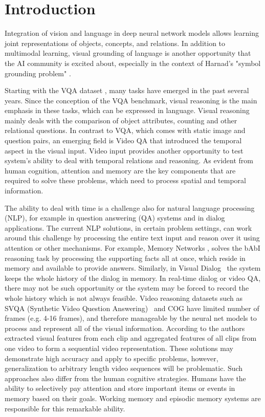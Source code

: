 \section{Introduction}

Integration of vision and language in deep neural network models allows learning joint representations of objects, concepts, and relations.  In addition to multimodal learning, visual grounding of language is another opportunity that the AI community is excited about, especially in the context of Harnad's "symbol grounding problem" \cite{harnad2003symbol}. 

Starting with the VQA dataset \cite{}, many tasks have emerged in the past several years\cite{mogadala2019trends}.  Since the conception of the VQA benchmark, visual reasoning is the main emphasis in these tasks, which can be expressed in language. Visual reasoning mainly deals with the comparison of object attributes, counting and other relational questions.
In contrast to VQA, which comes with static image and question pairs, an emerging field is Video QA \cite{} that introduced the temporal aspect in the visual input.  Video input provides another opportunity to test system's ability to deal with temporal relations and reasoning.  As evident from human cognition, attention and memory are the key components that are required to solve these problems, which need to process spatial and temporal information.

The ability to deal with time is a challenge also for natural language processing (NLP), for example in question answering (QA) systems and in dialog applications.  The current NLP solutions, in certain problem settings, can work around this challenge by processing the entire text input and reason over it using attention \cite{vaswani2017attention} or other mechanisms. For example, Memory Networks \cite{weston2015towards}, solves the bAbI reasoning task by processing the supporting facts all at once, which reside in memory and available to provide answers. Similarly, in Visual Dialog~\cite{das2017visual} the system keeps the whole history of the dialog in memory.  In real-time dialog or video QA, there may not be such opportunity or the system may be forced to record the whole history which is not always feasible.  Video reasoning datasets such as SVQA (Synthetic Video Question Answering)~\cite{song2018explore} and COG \cite{yang2018dataset} have limited number of frames (e.g. 4-16 frames), and therefore manageable by the neural net models to process and represent all of the visual information. According to\cite{song2018explore} the authors extracted visual features from each clip and aggregated features of all clips from one video to form a sequential video representation.
These solutions may demonstrate high accuracy and apply to specific problems, however, generalization to arbitrary length video sequences will be problematic.  Such approaches also differ from the human cognitive strategies.  Humans have the ability to selectively pay attention and store important items or events in memory based on their goals.  Working memory and episodic memory systems are responsible for this remarkable ability. 


